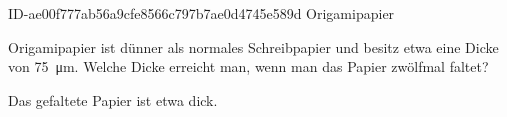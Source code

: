 \begin{exercise}
      {ID-ae00f777ab56a9cfe8566c797b7ae0d4745e589d}
      {Origamipapier}
  \ifproblem\problem\par
    Origamipapier ist dünner als normales Schreibpapier und besitz etwa eine
    Dicke von \SI{75}{\micro\metre}. Welche Dicke erreicht man, wenn man das
    Papier zwölfmal faltet?
  \fi
  \ifoutcome\outcome\par
    Das gefaltete Papier ist etwa  dick.
  \fi
\end{exercise}
